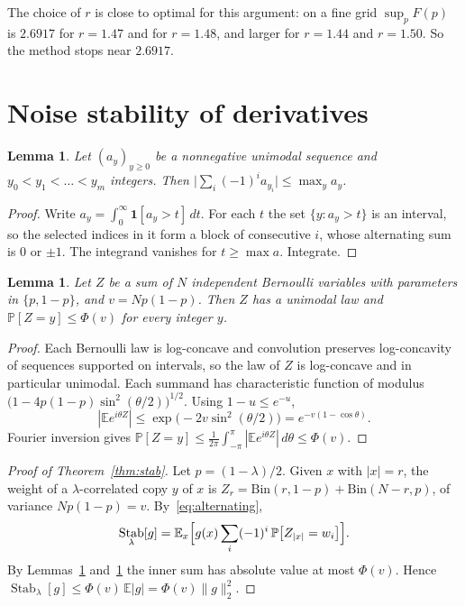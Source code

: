 \documentclass[11pt]{amsart}
\newtheorem{lemma}[theorem]{Lemma}
\theoremstyle{definition}
\theoremstyle{remark}
\newcommand{\E}{\mathbb E}
\renewcommand{\P}{\mathbb P}
\DeclareMathOperator{\Stab}{Stab}
\begin{document}
The choice of $r$ is close to optimal for this argument: on a fine grid $\sup_pF(p)$ is $2.6917$ for $r=1.47$ and for $r=1.48$, and larger for $r=1.44$ and $r=1.50$. So the method stops near $2.6917$.

\section{Noise stability of derivatives}\label{sec:stab}

\begin{lemma}\label{lem:unimodal}
Let $(a_y)_{y\ge0}$ be a nonnegative unimodal sequence and $y_0<y_1<\dots<y_m$ integers. Then $\bigl|\sum_i(-1)^ia_{y_i}\bigr|\le\max_ya_y$.
\end{lemma}

\begin{proof}
Write $a_y=\int_0^\infty\mathbf 1[a_y>t]\,dt$. For each $t$ the set $\{y:a_y>t\}$ is an interval, so the selected indices in it form a block of consecutive $i$, whose alternating sum is $0$ or $\pm1$. The integrand vanishes for $t\ge\max a$. Integrate.
\end{proof}

\begin{lemma}\label{lem:atom}
Let $Z$ be a sum of $N$ independent Bernoulli variables with parameters in $\{p,1-p\}$, and $v=Np(1-p)$. Then $Z$ has a unimodal law and $\P[Z=y]\le\Phi(v)$ for every integer $y$.
\end{lemma}

\begin{proof}
Each Bernoulli law is log-concave and convolution preserves log-concavity of sequences supported on intervals, so the law of $Z$ is log-concave and in particular unimodal. Each summand has characteristic function of modulus $\bigl(1-4p(1-p)\sin^2(\theta/2)\bigr)^{1/2}$. Using $1-u\le e^{-u}$,
\[
 |\E e^{i\theta Z}|\le\exp\bigl(-2v\sin^2(\theta/2)\bigr)=e^{-v(1-\cos\theta)}.
\]
Fourier inversion gives $\P[Z=y]\le\frac1{2\pi}\int_{-\pi}^\pi|\E e^{i\theta Z}|\,d\theta\le\Phi(v)$.
\end{proof}

\begin{proof}[Proof of Theorem~\ref{thm:stab}]
Let $p=(1-\lambda)/2$. Given $x$ with $|x|=r$, the weight of a $\lambda$-correlated copy $y$ of $x$ is $Z_r=\mathrm{Bin}(r,1-p)+\mathrm{Bin}(N-r,p)$, of variance $Np(1-p)=v$. By~\eqref{eq:alternating},
\[
 \Stab_\lambda[g]=\E_x\Bigl[g(x)\sum_i(-1)^i\,\P\bigl[Z_{|x|}=w_i\bigr]\Bigr].
\]
By Lemmas~\ref{lem:unimodal} and~\ref{lem:atom} the inner sum has absolute value at most $\Phi(v)$. Hence $\Stab_\lambda[g]\le\Phi(v)\,\E|g|=\Phi(v)\|g\|_2^2$.
\end{proof}
\end{document}

